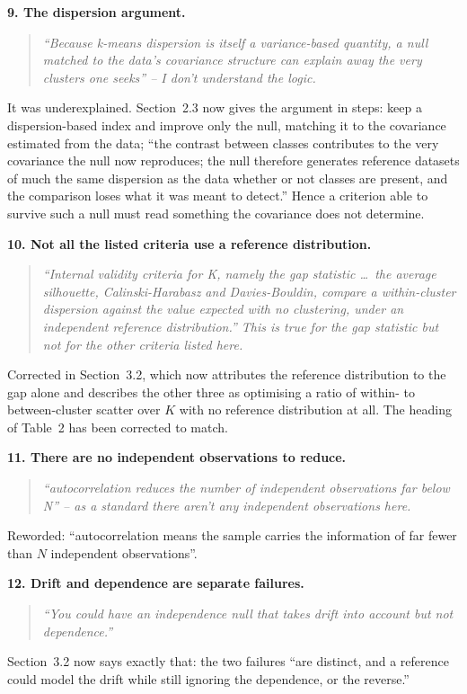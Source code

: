 \documentclass[11pt]{article}
\newcommand{\R}[1]{\medskip\noindent\textbf{#1}\quad}
\newenvironment{rquote}{\begin{quote}\itshape}{\end{quote}}
\begin{document}
\R{9. The dispersion argument.}
\begin{rquote}
``Because k-means dispersion is itself a variance-based quantity, a null
matched to the data's covariance structure can explain away the very clusters
one seeks'' -- I don't understand the logic.
\end{rquote}
It was underexplained. Section~2.3 now gives the argument in steps: keep a
dispersion-based index and improve only the null, matching it to the covariance
estimated from the data; ``the contrast between classes contributes to the very
covariance the null now reproduces; the null therefore generates reference
datasets of much the same dispersion as the data whether or not classes are
present, and the comparison loses what it was meant to detect.'' Hence a
criterion able to survive such a null must read something the covariance does
not determine.

\R{10. Not all the listed criteria use a reference distribution.}
\begin{rquote}
``Internal validity criteria for K, namely the gap statistic \dots\ the average
silhouette, Calinski-Harabasz and Davies-Bouldin, compare a within-cluster
dispersion against the value expected with no clustering, under an independent
reference distribution.'' This is true for the gap statistic but not for the
other criteria listed here.
\end{rquote}
Corrected in Section~3.2, which now attributes the reference distribution to
the gap alone and describes the other three as optimising a ratio of within- to
between-cluster scatter over $K$ with no reference distribution at all. The
heading of Table~2 has been corrected to match.

\R{11. There are no independent observations to reduce.}
\begin{rquote}
``autocorrelation reduces the number of independent observations far below N''
-- as a standard there aren't any independent observations here.
\end{rquote}
Reworded: ``autocorrelation means the sample carries the information of far
fewer than $N$ independent observations''.

\R{12. Drift and dependence are separate failures.}
\begin{rquote}
``You could have an independence null that takes drift into account but not
dependence.''
\end{rquote}
Section~3.2 now says exactly that: the two failures ``are distinct, and a
reference could model the drift while still ignoring the dependence, or the
reverse.''
\end{document}
